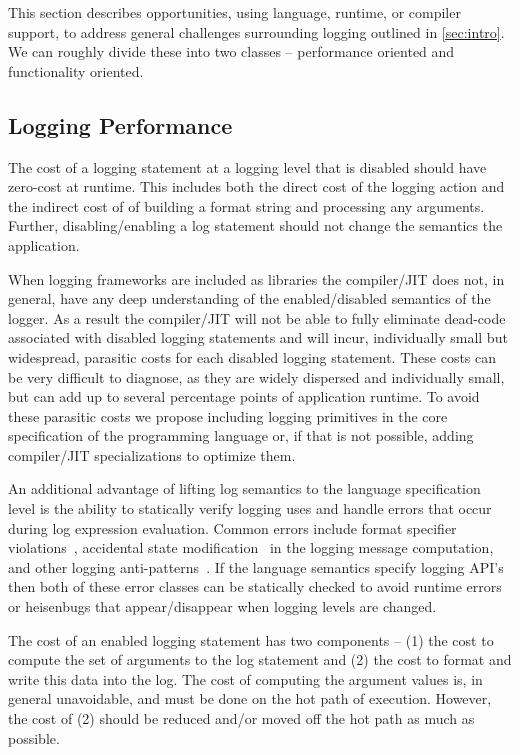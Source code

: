 This section describes opportunities, using language, runtime, or compiler support, to address 
general challenges surrounding logging outlined in \autoref{sec:intro}. We can roughly divide 
these into two classes -- performance oriented and functionality oriented. 

\subsection{Logging Performance}
\label{subsec:performancedesign}

\begin{design}
The cost of a logging statement at a logging level that 
is disabled should have zero-cost at runtime. This includes both the direct 
cost of the logging action and the indirect cost of of building a format 
string and processing any arguments. Further, disabling/enabling a log 
statement should not change the semantics the application.
\end{design}

When logging frameworks are included as libraries the compiler/JIT does not, 
in general, have any deep understanding of the enabled/disabled semantics of 
the logger. As a result the compiler/JIT will not be able to fully eliminate 
dead-code associated with disabled logging statements and will incur, individually 
small but widespread, parasitic costs for each disabled logging statement. 
These costs can be very difficult to diagnose, as they are widely dispersed and 
individually small, but can add up to several percentage points of application 
runtime. To avoid these parasitic costs we propose including logging primitives 
in the core specification of the programming language or, if that is not possible, 
adding compiler/JIT specializations to optimize them. 

An additional advantage of lifting log semantics to the language specification 
level is the ability to statically verify logging uses and handle errors that 
occur during log expression evaluation. Common errors include 
format specifier violations~\cite{tyepcheckprintf}, accidental state 
modification~\cite{mypurity,choipurity} in the logging message computation, and other logging anti-patterns~\cite{logginganti}. 
If the language semantics 
specify logging API's then both of these error classes can be statically 
checked to avoid runtime errors or heisenbugs that appear/disappear when logging 
levels are changed.

\begin{design}
The cost of an enabled logging statement has two components -- (1) the cost to 
compute the set of arguments to the log statement and (2) the cost to format and 
write this data into the log. The cost of computing the argument values is, in 
general unavoidable, and must be done on the hot path of execution. However, 
the cost of (2) should be reduced and/or moved off the hot path as much as possible.
\end{design}

